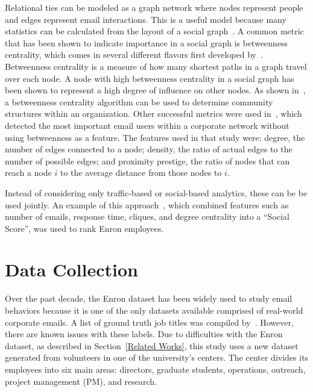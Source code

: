 \documentclass[10pt,twocolumn,conference]{IEEEtran}
\begin{document}
Relational ties can be modeled as a graph network where nodes represent people and edges represent email interactions.  This is a useful model because many statistics can be calculated from the layout of a social graph~\cite{wasserman_social_1994}.  A common metric that has been shown to indicate importance in a social graph is betweenness centrality, which comes in several different flavors first developed by~\cite{freeman_set_1977}.  Betweenness centrality is a measure of how many shortest paths in a graph travel over each node.  A node with high betweenness centrality in a social graph has been shown to represent a high degree of influence on other nodes.  As shown in~\cite{tyler_email_2003}, a betweenness centrality algorithm can be used to determine community structures within an organization.  Other successful metrics were used in~\cite{wilson_discovery_2009}, which detected the most important email users within a corporate network without using betweenness as a feature.  The features used in that study were: degree, the number of edges connected to a node; density, the ratio of actual edges to the number of possible edges; and proximity prestige, the ratio of nodes that can reach a node $i$ to the average distance from those nodes to $i$.

Instead of considering only traffic-based or social-based analytics, these can be be used jointly.  An example of this approach~\cite{rowe_automated_2007}, which combined features such as number of emails, response time, cliques, and degree centrality into a ``Social Score'', was used to rank Enron employees.  

\section{Data Collection} \label{Data Collection}

Over the past decade, the Enron dataset has been widely used to study email behaviors because it is one of the only datasets available comprised of real-world corporate emails.  A list of ground truth job titles was compiled by~\cite{shetty_status_2004}.  However, there are known issues with these labels.  Due to difficulties with the Enron dataset, as described in Section~\ref{Related Works}, this study uses a new dataset generated from volunteers in one of the university's centers.  The center divides its employees into six main areas: directors, graduate students, operations, outreach, project management (PM), and research.
\end{document}
